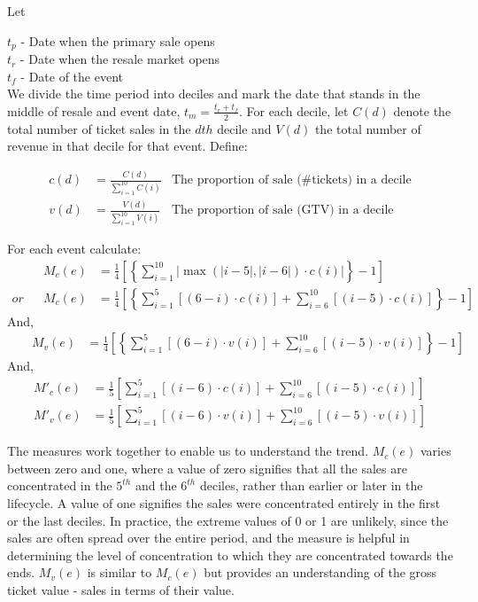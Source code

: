 \documentclass[letterpaper, 12pt]{article}
\begin{document}
\noindent Let

\noindent $t_p$ - Date when the primary sale opens\\
$t_r$ - Date when the resale market opens\\
$t_f$ - Date of the event\\ 

We divide the time period into deciles and mark the date that stands in the middle of resale and event date, $t_m = \frac{t_r+t_f}{2}$. For each decile, let $C(d)$ denote the total number of ticket sales in the $dth$ decile and $V(d)$ the total number of revenue in that decile for that event. Define:

\begin{align*}
	c(d) &= \frac{C(d)}{\sum_{i=1}^{10}C(i)}&\text{The proportion of sale (\# tickets) in a decile}\\
	v(d) &= \frac{V(d)}{\sum_{i=1}^{10}V(i)}&\text{The proportion of sale (GTV) in a decile}
\end{align*}

\noindent For each event calculate:
\begin{align*}
	&&M_c(e) &= \frac{1}{4}\left[\left\{\sum_{i=1}^{10} \left| \max(|i-5|,|i-6|) \cdot c(i) \right|\right\} -1 \right]\\
	or&&M_c(e) &= \frac{1}{4}\left[\left\{\sum_{i=1}^{5} \left[ (6-i) \cdot c(i) \right] +\sum_{i=6}^{10} \left[ (i-5) \cdot c(i) \right]\right\} -1 \right]
\end{align*}
And,
\begin{align*}
	&&M_v(e) &= \frac{1}{4}\left[\left\{\sum_{i=1}^{5} \left[ (6-i) \cdot v(i) \right] +\sum_{i=6}^{10} \left[ (i-5) \cdot v(i) \right]\right\} -1 \right]
\end{align*}
And,
\begin{align*}
	M'_c(e) &= \frac{1}{5}\left[\sum_{i=1}^{5} \left[ (i-6) \cdot c(i) \right] +\sum_{i=6}^{10} \left[ (i-5) \cdot c(i) \right]\right]\\
	M'_v(e) &= \frac{1}{5}\left[\sum_{i=1}^{5} \left[ (i-6) \cdot v(i) \right] +\sum_{i=6}^{10} \left[ (i-5) \cdot v(i) \right]\right]
\end{align*}

The measures work together to enable us to understand the trend. $M_c(e)$ varies between zero and one, where a value of zero signifies that all the sales are concentrated in the $5^{th}$ and the $6^{th}$ deciles, rather than earlier or later in the lifecycle. A value of one signifies the sales were concentrated entirely in the first or the last deciles. In practice, the extreme values of 0 or 1 are unlikely, since the sales are often spread over the entire period, and the measure is helpful in determining the level of concentration to which they are concentrated towards the ends. $M_v(e)$ is similar to $M_c(e)$ but provides an understanding of the gross ticket value - sales in terms of their value.
\end{document}
